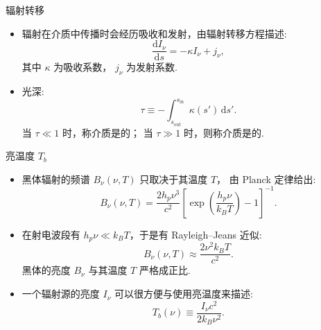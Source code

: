 \documentclass{beamer}
\newcommand{\R}[1]{\text{#1}}  %
\newcommand{\D}[1]{\R{d}#1}
\newcommand{\diff}[2]{\frac{\D{#1}}{\D{#2}}}
\let\emph\relax  %
\begin{document}
\begin{frame}{辐射转移}
  \begin{itemize}
    \item 辐射在介质中传播时会经历吸收和发射，由\alert{辐射转移方程}描述:
      \begin{equation}
        \diff{I_{\nu}}{s} = -\kappa I_{\nu} + j_{\nu} ,
      \end{equation}
      其中 $\kappa$ 为吸收系数， $j_{\nu}$ 为发射系数.
    \item \alert{光深}:
      \begin{equation}
        \tau \equiv
          - \int_{s_{\R{out}}}^{s_{\R{in}}} \kappa(s') \,\D{s'} .
      \end{equation}
      当 $\tau \ll 1$ 时，称介质是\emph{光学薄}的；
      当 $\tau \gg 1$ 时，则称介质是\emph{光学厚}的.
  \end{itemize}
\end{frame}

\begin{frame}{亮温度 $T_b$}
  \begin{itemize}
    \item \alert{黑体辐射}的频谱 $B_{\nu}(\nu, T)$ 只取决于其温度 $T$，
      由 \alert{Planck 定律}给出:
      \begin{equation}
        B_{\nu}(\nu, T) =
          \frac{2 h_p \nu^3}{c^2} \left[ \exp\left(
            \frac{h_p \nu}{k_B T} \right) - 1 \right]^{-1} .
      \end{equation}
    \item 在射电波段有 $h_p \nu \ll k_B T$，于是有 \alert{Rayleigh--Jeans 近似}:
      \begin{equation}
        B_{\nu}(\nu, T) \approx \frac{2 \nu^2 k_B T}{c^2} .
      \end{equation}
      黑体的亮度 $B_{\nu}$ 与其温度 $T$ 严格成正比.
    \item 一个辐射源的亮度 $I_{\nu}$ 可以很方便与使用\alert{亮温度}来描述:
      \begin{equation}
        T_b(\nu) \equiv \frac{I_{\nu} c^2}{2 k_B \nu^2} .
      \end{equation}
  \end{itemize}
\end{frame}
\end{document}
